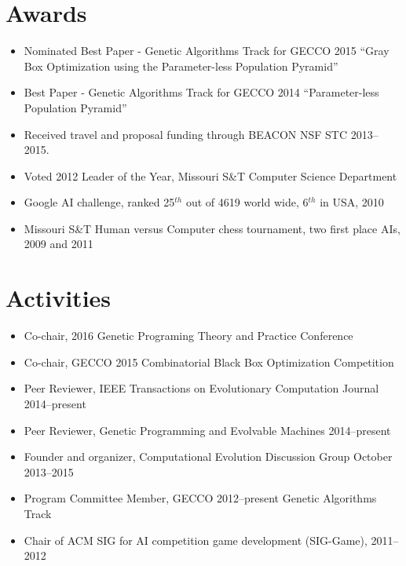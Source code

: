 \documentclass[a4paper,11pt]{article}
\begin{document}
\section{Awards}
\begin{itemize}
\item     Nominated Best Paper - Genetic Algorithms Track for GECCO 2015 ``Gray Box Optimization using the Parameter-less Population Pyramid''
\item     Best Paper - Genetic Algorithms Track for GECCO 2014 ``Parameter-less Population Pyramid''
\item     Received travel and proposal funding through BEACON NSF STC 2013--2015.
\item     Voted 2012 Leader of the Year, Missouri S\&T Computer Science Department
\item     Google AI challenge, ranked 25$^{th}$ out of 4619 world wide, 6$^{th}$ in USA, 2010
\item     Missouri S\&T Human versus Computer chess tournament, two first place AIs, 2009 and 2011
\end{itemize}

\section{Activities}
\begin{itemize}
\item     Co-chair, 2016 Genetic Programing Theory and Practice Conference
\item     Co-chair, GECCO 2015 Combinatorial Black Box Optimization Competition
\item     Peer Reviewer, IEEE Transactions on Evolutionary Computation Journal 2014--present
\item     Peer Reviewer, Genetic Programming and Evolvable Machines 2014--present
\item     Founder and organizer, Computational Evolution Discussion Group October 2013--2015
\item     Program Committee Member, GECCO 2012--present Genetic Algorithms Track
\item     Chair of ACM SIG for AI competition game development (SIG-Game), 2011--2012
\end{itemize}
\end{document}
